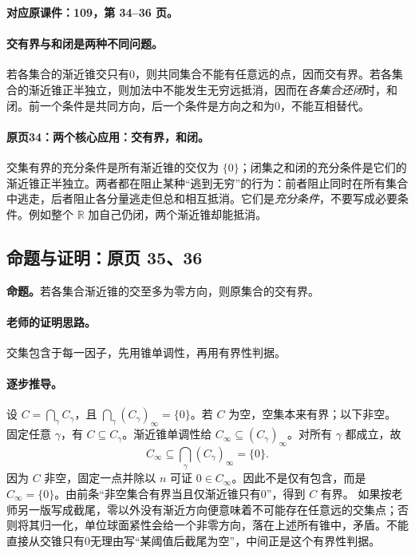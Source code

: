 \documentclass[11pt,a4paper]{article}
\newcommand{\R}{\mathbb{R}}\newcommand{\N}{\mathbb{N}}
\theoremstyle{definition}\newtheorem{definition}{定义}\newtheorem{example}{例}
\begin{document}
\textbf{对应原课件：109，第 34--36 页。}


\paragraph{交有界与和闭是两种不同问题。}
若各集合的渐近锥交只有0，则共同集合不能有任意远的点，因而交有界。若各集合的渐近锥正半独立，则加法中不能发生无穷远抵消，因而在\emph{各集合还闭}时，和闭。前一个条件是共同方向，后一个条件是方向之和为0，不能互相替代。


\paragraph{原页34：两个核心应用：交有界，和闭。}交集有界的充分条件是所有渐近锥的交仅为 $\{0\}$；闭集之和闭的充分条件是它们的渐近锥正半独立。两者都在阻止某种“逃到无穷”的行为：前者阻止同时在所有集合中逃走，后者阻止各分量逃走但总和相互抵消。它们是\emph{充分条件}，不要写成必要条件。例如整个 $\R$ 加自己仍闭，两个渐近锥却能抵消。



\subsection{命题与证明：原页 35、36}

\textbf{命题。}若各集合渐近锥的交至多为零方向，则原集合的交有界。

\paragraph{老师的证明思路。}交集包含于每一因子，先用锥单调性，再用有界性判据。

\paragraph{逐步推导。}
设 $C=\bigcap_\gamma C_\gamma$，且 $\bigcap_\gamma(C_\gamma)_\infty=\{0\}$。若 $C$ 为空，空集本来有界；以下非空。
固定任意 $\gamma$，有 $C\subseteq C_\gamma$。渐近锥单调性给 $C_\infty\subseteq(C_\gamma)_\infty$。对所有 $\gamma$ 都成立，故
\[C_\infty\subseteq\bigcap_\gamma(C_\gamma)_\infty=\{0\}.\]
因为 $C$ 非空，固定一点并除以 $n$ 可证 $0\in C_\infty$。因此不是仅有包含，而是 $C_\infty=\{0\}$。由前条“非空集合有界当且仅渐近锥只有0”，得到 $C$ 有界。
如果按老师另一版写成截尾，零以外没有渐近方向便意味着不可能存在任意远的交集点；否则将其归一化，单位球面紧性会给一个非零方向，落在上述所有锥中，矛盾。不能直接从交锥只有0无理由写“某阈值后截尾为空”，中间正是这个有界性判据。
\end{document}
